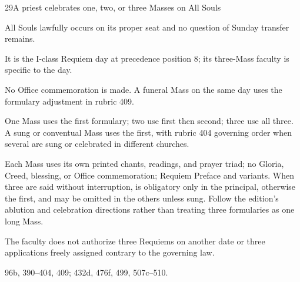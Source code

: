 \begin{casefile}{29}{A priest celebrates one, two, or three Masses on All Souls}
\item[Calendar facts] All Souls lawfully occurs on its proper seat and no question of Sunday transfer remains.
\item[Ranks and rows] It is the I-class Requiem day at precedence position 8; its three-Mass faculty is specific to the day.
\item[Impeded item] No Office commemoration is made.  A funeral Mass on the same day uses the formulary adjustment in rubric 409.
\item[Mass category] One Mass uses the first formulary; two use first then second; three use all three.  A sung or conventual Mass uses the first, with rubric 404 governing order when several are sung or celebrated in different churches.
\item[Assembly] Each Mass uses its own printed chants, readings, and prayer triad; no Gloria, Creed, blessing, or Office commemoration; Requiem Preface and variants.  When three are said without interruption,  is obligatory only in the principal, otherwise the first, and may be omitted in the others unless sung.  Follow the edition's ablution and celebration directions rather than treating three formularies as one long Mass.
\item[Boundary] The faculty does not authorize three Requiems on another date or three applications freely assigned contrary to the governing law.
\item[Rubric locus] 96b, 390--404, 409; 432d, 476f, 499, 507c--510.
\end{casefile}

